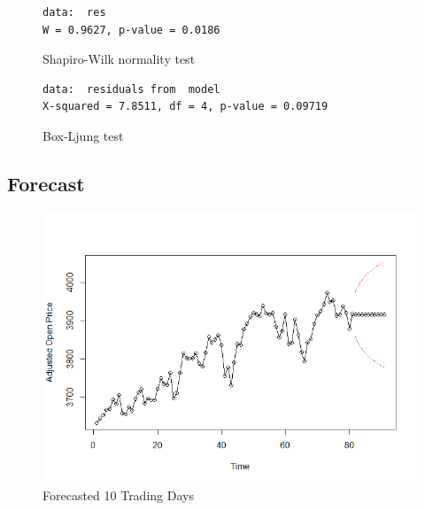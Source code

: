 \documentclass[12pt, centerh1]{article}
\begin{document}
\begin{figure}[H]
\centering
\begin{BVerbatim}
data:  res
W = 0.9627, p-value = 0.0186
\end{BVerbatim}
\caption{Shapiro-Wilk normality test}
\label{fig:sharpiro}
\end{figure}

\begin{figure}[H]
\centering
\begin{BVerbatim}
data:  residuals from  model
X-squared = 7.8511, df = 4, p-value = 0.09719
\end{BVerbatim}
\caption{Box-Ljung test}
\label{fig:boxL}
\end{figure}

\subsection{Forecast}
\begin{figure}[H]
    \centering
    \includegraphics[scale=0.5]{imgs/forecast.png}
    \caption{Forecasted 10 Trading Days}
    \label{fig:forecast}
\end{figure}
\end{document}

